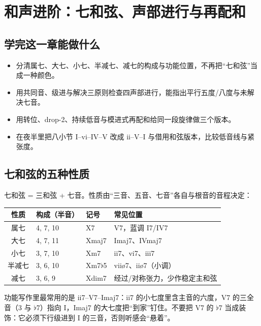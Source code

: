 \clearpage
\chapter{和声进阶：七和弦、声部进行与再配和}
\label{chap:advanced-harmony}


\section*{学完这一章能做什么}
\begin{itemize}
  \item 分清属七、大七、小七、半减七、减七的构成与功能位置，不再把“七和弦”当成一种颜色。
  \item 用共同音、级进与解决三原则检查四声部进行，能指出平行五度/八度与未解决七音。
  \item 用转位、drop-2、持续低音与模进式再配和给同一段旋律做三个版本。
  \item 在夜半里把八小节 I--vi--IV--V 改成 ii--V--I 与借用和弦版本，比较低音线与紧张度。
\end{itemize}

\section{七和弦的五种性质}

七和弦 = 三和弦 + 七音。性质由“三音、五音、七音”各自与根音的音程决定：

\begin{center}
\small
\begin{tabular}{clll}
\toprule
性质 & 构成（半音） & 记号 & 常见位置 \\
\midrule
属七 & 4, 7, 10 & X7 & V7，蓝调 I7/IV7 \\
大七 & 4, 7, 11 & Xmaj7 & Imaj7、IVmaj7 \\
小七 & 3, 7, 10 & Xm7 & ii7、vi7、iii7 \\
半减七 & 3, 6, 10 & Xm7\(\flat\)5 & viiø7、iiø7（小调） \\
减七 & 3, 6, 9 & Xdim7 & 经过/对称张力，少作稳定主和弦 \\
\bottomrule
\end{tabular}
\end{center}

功能写作里最常用的是 ii7--V7--Imaj7：ii7 的小七度里含主音的六度，V7 的三全音（3 与 \(\flat\)7）指向 I，Imaj7 的大七度把“到家”钉住。不要把 V7 的 \(\flat\)7 当成装饰：它必须下行级进到 I 的三音，否则听感会“悬着”。

